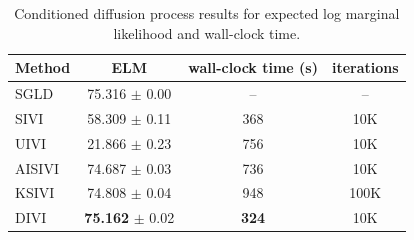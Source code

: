 \begin{table}[t]
\centering
\caption{Conditioned diffusion process results for expected log marginal likelihood and wall-clock time.}
\label{tab:langevin-final-eval}
\begin{tabular}{lccc}
\toprule
Method & ELM & wall-clock time (s) & iterations \\
\midrule
SGLD & 75.316 $\pm$ {\footnotesize 0.00} & -- & -- \\
\midrule
SIVI & 58.309 $\pm$ {\footnotesize 0.11} & 368 & 10K \\
UIVI & 21.866 $\pm$ {\footnotesize 0.23} & 756 & 10K \\
AISIVI & 74.687 $\pm$ {\footnotesize 0.03} & 736 & 10K \\
KSIVI & 74.808 $\pm$ {\footnotesize 0.04} & 948 & 100K \\
DIVI & \textbf{75.162} $\pm$ {\footnotesize 0.02} & \textbf{324} & 10K \\
\bottomrule
\end{tabular}
\end{table}
